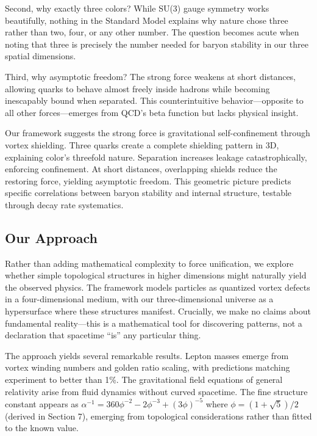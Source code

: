 Second, why exactly three colors? While SU(3) gauge symmetry works beautifully, nothing in the Standard Model explains why nature chose three rather than two, four, or any other number. The question becomes acute when noting that three is precisely the number needed for baryon stability in our three spatial dimensions.

Third, why asymptotic freedom? The strong force weakens at short distances, allowing quarks to behave almost freely inside hadrons while becoming inescapably bound when separated. This counterintuitive behavior---opposite to all other forces---emerges from QCD's beta function but lacks physical insight.

Our framework suggests the strong force is gravitational self-confinement through vortex shielding. Three quarks create a complete shielding pattern in 3D, explaining color's threefold nature. Separation increases leakage catastrophically, enforcing confinement. At short distances, overlapping shields reduce the restoring force, yielding asymptotic freedom. This geometric picture predicts specific correlations between baryon stability and internal structure, testable through decay rate systematics.

\subsection{Our Approach}

Rather than adding mathematical complexity to force unification, we explore whether simple topological structures in higher dimensions might naturally yield the observed physics. The framework models particles as quantized vortex defects in a four-dimensional medium, with our three-dimensional universe as a hypersurface where these structures manifest. Crucially, we make no claims about fundamental reality---this is a mathematical tool for discovering patterns, not a declaration that spacetime ``is'' any particular thing.

The approach yields several remarkable results. Lepton masses emerge from vortex winding numbers and golden ratio scaling, with predictions matching experiment to better than 1\%. The gravitational field equations of general relativity arise from fluid dynamics without curved spacetime. The fine structure constant appears as $\alpha^{-1} = 360\phi^{-2} - 2\phi^{-3} + (3\phi)^{-5}$ where $\phi = (1+\sqrt{5})/2$ (derived in Section 7), emerging from topological considerations rather than fitted to the known value.

